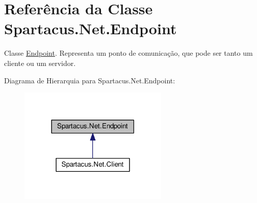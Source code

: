 \hypertarget{classSpartacus_1_1Net_1_1Endpoint}{\section{Referência da Classe Spartacus.\+Net.\+Endpoint}
\label{classSpartacus_1_1Net_1_1Endpoint}
}


Classe \hyperlink{classSpartacus_1_1Net_1_1Endpoint}{Endpoint}. Representa um ponto de comunicação, que pode ser tanto um cliente ou um servidor.  




Diagrama de Hierarquia para Spartacus.\+Net.\+Endpoint\+:
\nopagebreak
\begin{figure}[H]
\begin{center}
\leavevmode
\includegraphics[width=201pt]{classSpartacus_1_1Net_1_1Endpoint__inherit__graph}
\end{center}
\end{figure}
